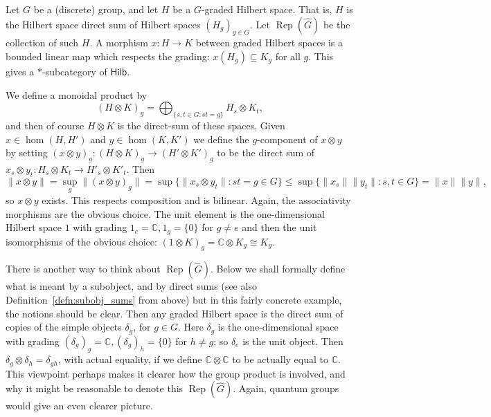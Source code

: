 \documentclass[a4paper,11pt]{article}
\theoremstyle{plain}
\theoremstyle{remark}
\newenvironment{example}
  {\pushQED{\qed}\renewcommand{\qedsymbol}{$\triangle$}\examplex}
  {\popQED\endexamplex}
\newcommand{\catHilb}{\textsf{Hilb}}
\newcommand{\Rep}{\operatorname{Rep}}
\begin{document}
\begin{example}\label{eg:dualreps}
Let $G$ be a (discrete) group, and let $H$ be a $G$-graded Hilbert space.  That is, $H$ is the Hilbert space direct sum of Hilbert spaces $(H_g)_{g\in G}$.  Let $\Rep(\hat G)$ be the collection of such $H$.  A morphism $x \colon H\to K$ between graded Hilbert spaces is a bounded linear map which respects the grading: $x(H_g) \subseteq K_g$ for all $g$.  This gives a $*$-subcategory of $\catHilb$.

We define a monoidal product by
\[ (H\otimes K)_g = \bigoplus_{\{s,t\in G : st=g \}} H_s \otimes K_t, \]
and then of course $H\otimes K$ is the direct-sum of these spaces.  Given $x\in\hom(H,H')$ and $y\in\hom(K,K')$ we define the $g$-component of $x\otimes y$ by setting $(x\otimes y)_g \colon (H\otimes K)_g \to (H'\otimes K')_g$ to be the direct sum of $x_s \otimes y_t \colon H_s \otimes K_t \to H'_s \otimes K'_t$.  Then
\[ \|x\otimes y\| = \sup_g \|(x\otimes y)_g\| = \sup \big\{ \|x_s \otimes y_t\| : st=g \in G \big\}
\leq \sup \{ \|x_s\| \|y_t\| : s,t\in G \} = \|x\| \|y\|, \]
so $x\otimes y$ exists.  This respects composition and is bilinear.  Again, the associativity morphisms are the obvious choice.  The unit element is the one-dimensional Hilbert space $1$ with grading $1_e=\mathbb C, 1_g=\{0\}$ for $g\not=e$ and then the unit isomorphisms of the obvious choice: $(1\otimes K)_g = \mathbb C \otimes K_g \cong K_g$.

There is another way to think about $\Rep(\hat G)$.  Below we shall formally define what is meant by a subobject, and by direct sums (see also Definition~\ref{defn:subobj_sums} from above) but in this fairly concrete example, the notions should be clear.  Then any graded Hilbert space is the direct sum of copies of the simple objects $\delta_g$, for $g\in G$.  Here $\delta_g$ is the one-dimensional space with grading $(\delta_g)_g = \mathbb C, (\delta_g)_h = \{0\}$ for $h\not=g$; so $\delta_e$ is the unit object.  Then $\delta_g \otimes \delta_h = \delta_{gh}$, with actual equality, if we define $\mathbb C \otimes \mathbb C$ to be actually equal to $\mathbb C$.  This viewpoint perhaps makes it clearer how the group product is involved, and why it might be reasonable to denote this $\Rep(\hat G)$.  Again, quantum groups would give an even clearer picture.
\end{example}
\end{document}
